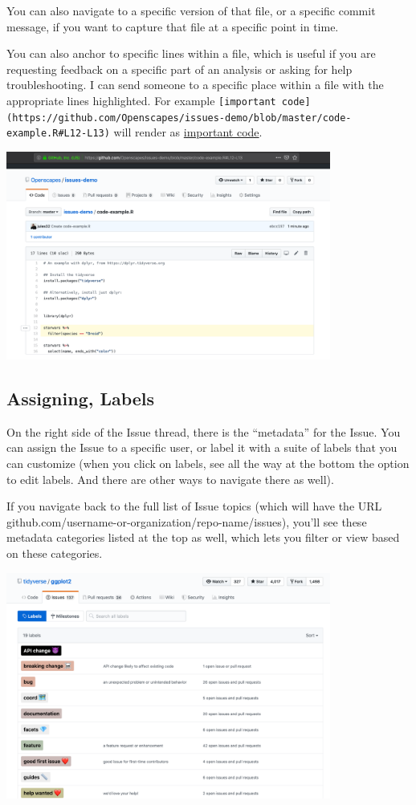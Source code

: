 \documentclass[
  letterpaper,
  DIV=11,
  numbers=noendperiod]{scrreprt}
\begin{document}
You can also navigate to a specific version of that file, or a specific
commit message, if you want to capture that file at a specific point in
time.

You can also anchor to specific lines within a file, which is useful if
you are requesting feedback on a specific part of an analysis or asking
for help troubleshooting. I can send someone to a specific place within
a file with the appropriate lines highlighted. For example
\texttt{{[}important\ code{]}(https://github.com/Openscapes/issues-demo/blob/master/code-example.R\#L12-L13)}
will render as
\href{https://github.com/Openscapes/issues-demo/blob/master/code-example.R\#L12-L13}{important
code}.

\includegraphics[width=0.8\textwidth,height=\textheight]{./img/github-anchor-lines.png}

\hypertarget{assigning-labels}{%
\subsection{Assigning, Labels}\label{assigning-labels}}

On the right side of the Issue thread, there is the ``metadata'' for the
Issue. You can assign the Issue to a specific user, or label it with a
suite of labels that you can customize (when you click on labels, see
all the way at the bottom the option to edit labels. And there are other
ways to navigate there as well).

If you navigate back to the full list of Issue topics (which will have
the URL github.com/username-or-organization/repo-name/issues), you'll
see these metadata categories listed at the top as well, which lets you
filter or view based on these categories.

\includegraphics[width=0.8\textwidth,height=\textheight]{./img/issues-labels.png}
\end{document}
